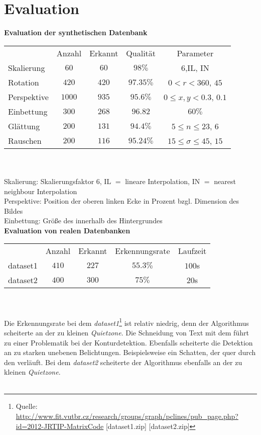 \section{Evaluation}

\textbf{Evaluation der synthetischen Datenbank} \\
\begin{tabular}{l c c c c}
 		& Anzahl & Erkannt & Qualität & Parameter \\
		Skalierung & $60$ & $60$ & $98\%$ & $6$,IL, IN \\
		Rotation  & $420$ & $420$ & $97.35\%$ & $0<r<360$, $45$\\
		Perspektive & $1000$ & $935$ & $95.6\%$ & $0 \leq x,y<0.3$, $0.1$\\
		Einbettung & $300$ & $268$ &  $96.82$ & $60\%$\\
		Glättung & $200$ & $131$ & $94.4\%$ &  $5\leq n \leq 23$, $6$\\
		Rauschen & $200$ & $116$ & $95.24\%$ & $15 \leq \sigma \leq 45$, $15$\\
\end{tabular}
\\ \\
Skalierung: Skalierungsfaktor $6$, IL $=$ lineare Interpolation, IN $=$ nearest neighbour Interpolation\\
Perspektive: Position der oberen linken Ecke in Prozent bzgl. Dimension des Bildes \\
Einbettung: Größe des \QRCodes innerhalb des Hintergrundes \\

\textbf{Evaluation von realen Datenbanken} \\


\begin{tabular}{l c c c c}
 		& Anzahl & Erkannt & Erkennungsrate & Laufzeit \\
		dataset1 & $410$ & $227$ & $55.3\%$ & $100$s \\
		dataset2 & $400$ & $300$ & $75\%$ & $20$s \\
\end{tabular}
\\ \\
Die Erkennungsrate bei dem \emph{dataset1}\footnote{Quelle: \url{http://www.fit.vutbr.cz/research/groups/graph/pclines/pub_page.php?id=2012-JRTIP-MatrixCode} [dataset1.zip] [dataset2.zip]} ist relativ niedrig, denn der Algorithmus scheiterte an der zu kleinen  \emph{Quietzone}.
Die Schneidung von Text mit dem \QRCode führt zu einer Problematik bei der Konturdetektion. Ebenfalls scheiterte die Detektion an zu starken unebenen Belichtungen. Beispielsweise ein Schatten, der quer durch den \QRCode verläuft.
Bei dem \emph{dataset2} scheiterte der Algorithmus ebenfalls an der zu kleinen \emph{Quietzone}. \\ \\


